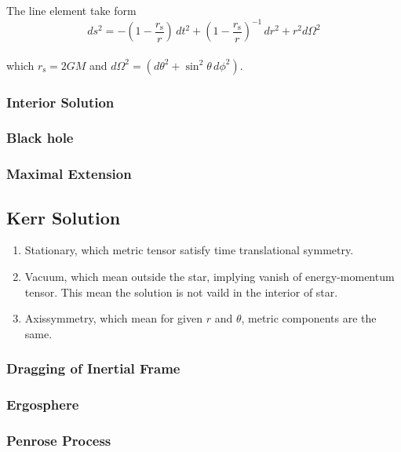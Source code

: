 \documentclass[12pt]{article}
\theoremstyle{mystyle}{\newtheorem{definition}{Definition}[section]}
\theoremstyle{mystyle}{\newtheorem{theorem}[definition]{Theorem}}
\theoremstyle{mystyle}{\newtheorem*{remark}{Remark}}
\theoremstyle{mystyle}{\newtheorem*{example}{Example}}
\theoremstyle{mystyle}{\newtheorem*{examples}{Examples}}
\theoremstyle{cstyle}{\newtheorem*{cthm}{}}
\begin{document}
\begin{cthm}
  The line element take form 
  \[ds^2 = -\left(1 - \frac{r_\mathrm{s}}{r} \right)\,dt^2 + \left(1-\frac{r_\mathrm{s}}{r}\right)^{-1} \,dr^2 + r^2 d\Omega^2\]\\
  which \(r_\mathrm{s} = 2GM\) and \(d\Omega^2 = \left(d\theta^2 + \sin^2\theta \, d\phi^2\right)\).
\end{cthm}
\subsubsection{Interior Solution}

\subsubsection{Black hole}

\subsubsection{Maximal Extension}

\subsection{Kerr Solution}

\begin{enumerate}
  \item Stationary, which metric tensor satisfy time translational symmetry.
  \item Vacuum, which mean outside the star, implying vanish of energy-momentum tensor. This mean the solution is not vaild in the interior of star.
  \item Axissymmetry, which mean for given \(r\) and \(\theta\), metric components are the same.
\end{enumerate}

\subsubsection{Dragging of Inertial Frame}

\subsubsection{Ergosphere}

\subsubsection{Penrose Process}
\end{document}
